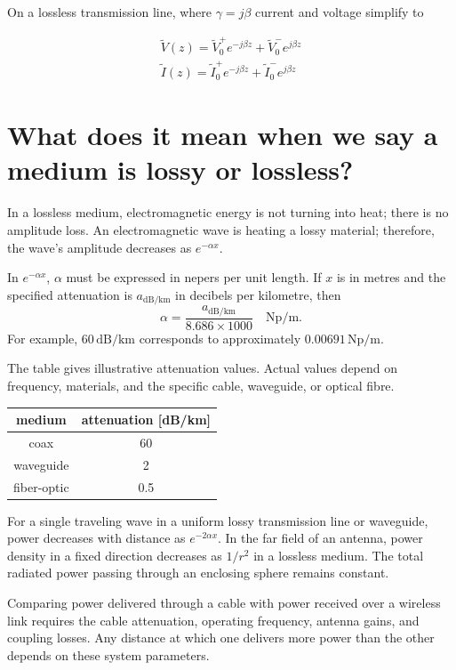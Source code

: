 \documentclass{ximera}
\begin{document}
On a lossless transmission line, where $\gamma= j\beta$ current and voltage simplify to 

\begin{eqnarray}
\tilde{V}(z)=\tilde{V}_0^+ e^{-j \beta z} + \tilde{V}_0^- e^{j \beta z} \nonumber \\ \nonumber
\tilde{I}(z)=\tilde{I}_0^+ e^{- j \beta z} + \tilde{I}_0^- e^{j \beta z}
\end{eqnarray}


\section{What does it mean when we say a medium is lossy or lossless?}
In a lossless medium, electromagnetic energy is not turning into heat; there is no amplitude loss. An electromagnetic wave is heating a lossy material; therefore, the wave's amplitude decreases as $e^{-\alpha x}$.

In $e^{-\alpha x}$, $\alpha$ must be expressed in nepers
per unit length. If $x$ is in metres and the specified
attenuation is $a_{\mathrm{dB/km}}$ in decibels per kilometre,
then
\[
\alpha=\frac{a_{\mathrm{dB/km}}}{8.686\times1000}
\quad \mathrm{Np}/\mathrm{m}.
\]
For example, $60\,\mathrm{dB/km}$ corresponds to approximately
$0.00691\,\mathrm{Np}/\mathrm{m}$.

The table gives illustrative attenuation values.
Actual values depend on frequency, materials, and the
specific cable, waveguide, or optical fibre.




\begin{center}
\begin{tabular}{|c|c|} \hline
medium     & attenuation [dB/km]     \\  \hline
coax        & 60                                 \\ \hline
 waveguide  & 2  \\ \hline          
fiber-optic &  0.5  \\ \hline
\end{tabular}
\end{center}


For a single traveling wave in a uniform lossy transmission
line or waveguide, power decreases with distance as
$e^{-2\alpha x}$.
In the far field of an antenna, power density in a fixed
direction decreases as $1/r^2$ in a lossless medium.
The total radiated power passing through an enclosing sphere
remains constant.

Comparing power delivered through a cable with power received
over a wireless link requires the cable attenuation, operating
frequency, antenna gains, and coupling losses.
Any distance at which one delivers more power than the other
depends on these system parameters.
\end{document}
